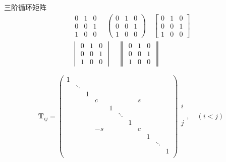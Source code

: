 \documentclass[UTF8, a4paper, 12pt, oneside, onecolumn]{article}
\begin{document}
三阶循环矩阵
\begin{gather*}
	\begin{matrix}
		0 & 1 & 0 \\
		0 & 0 & 1 \\
		1 & 0 & 0
	\end{matrix}\quad
	\begin{pmatrix}
		0 & 1 & 0 \\
		0 & 0 & 1 \\
		1 & 0 & 0
	\end{pmatrix}\quad
	\begin{bmatrix}
		0 & 1 & 0 \\
		0 & 0 & 1 \\
		1 & 0 & 0
	\end{bmatrix}\\
	\begin{vmatrix}
		0 & 1 & 0 \\
		0 & 0 & 1 \\
		1 & 0 & 0
	\end{vmatrix}\quad
	\begin{Vmatrix}
		0 & 1 & 0 \\
		0 & 0 & 1 \\
		1 & 0 & 0
	\end{Vmatrix}
\end{gather*}

\[\bm T_{ij} = \begin{pmatrix}
	1 \\
		& \ddots \\
		&		& 1 \\
		&		&	& c		&	 &		&	 & s \\
		&		&	&		& 1 \\
		&		&	&		&	& \ddots \\
		&		&	&		&	&		& 1 \\
		&		&	& -s	&	&		&	& c \\
		&		&	&		&	&		&	&	& 1 \\
		&		&	&		&	&		&	&	&	& \ddots \\
		&		&	&		&	&		&	&	&	&		& 1 \\
\end{pmatrix} \begin{matrix}
\\
\\
\\
i \\
\\
\\
\\
j \\
\\
\\
\\
\end{matrix},\quad (i < j)\]
\end{document}
